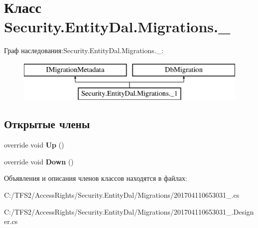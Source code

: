 \hypertarget{class_security_1_1_entity_dal_1_1_migrations_1_1__1}{}\section{Класс Security.\+Entity\+Dal.\+Migrations.\+\_}
\label{class_security_1_1_entity_dal_1_1_migrations_1_1__1}
Граф наследования\+:Security.\+Entity\+Dal.\+Migrations.\+\_\+:\begin{figure}[H]
\begin{center}
\leavevmode
\includegraphics[height=2.000000cm]{d6/de2/class_security_1_1_entity_dal_1_1_migrations_1_1__1}
\end{center}
\end{figure}
\subsection*{Открытые члены}
\begin{DoxyCompactItemize}
\item 
\mbox{\label{class_security_1_1_entity_dal_1_1_migrations_1_1__1_aaf315d3bbb3b6b4590c2ad7e9c0f8a3c}} 
override void {\bfseries Up} ()
\item 
\mbox{\label{class_security_1_1_entity_dal_1_1_migrations_1_1__1_a3597bb91b0598fca515b993d3e3c9f67}} 
override void {\bfseries Down} ()
\end{DoxyCompactItemize}


Объявления и описания членов классов находятся в файлах\+:\begin{DoxyCompactItemize}
\item 
C\+:/\+T\+F\+S2/\+Access\+Rights/\+Security.\+Entity\+Dal/\+Migrations/201704110653031\+\_.\+cs\item 
C\+:/\+T\+F\+S2/\+Access\+Rights/\+Security.\+Entity\+Dal/\+Migrations/201704110653031\+\_.\+Designer.\+cs\end{DoxyCompactItemize}
